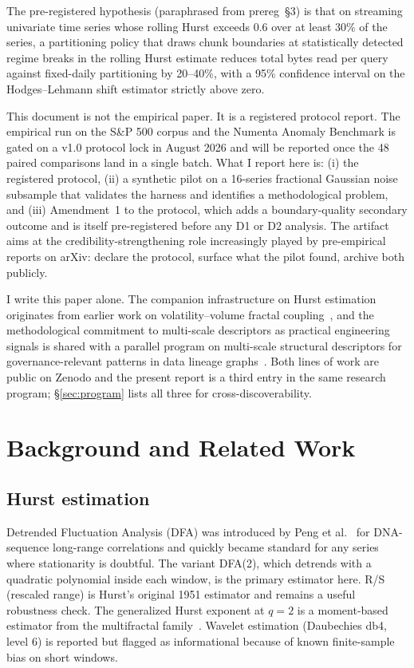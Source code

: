 \documentclass[11pt]{article}
\begin{document}
The pre-registered hypothesis (paraphrased from prereg~\S3) is that on streaming univariate time series whose rolling Hurst exceeds 0.6 over at least 30\% of the series, a partitioning policy that draws chunk boundaries at statistically detected regime breaks in the rolling Hurst estimate reduces total bytes read per query against fixed-daily partitioning by 20--40\%, with a 95\% confidence interval on the Hodges--Lehmann shift estimator strictly above zero.

This document is not the empirical paper. It is a registered protocol report. The empirical run on the S\&P 500 corpus and the Numenta Anomaly Benchmark is gated on a v1.0 protocol lock in August 2026 and will be reported once the 48 paired comparisons land in a single batch. What I report here is: (i) the registered protocol, (ii) a synthetic pilot on a 16-series fractional Gaussian noise subsample that validates the harness and identifies a methodological problem, and (iii) Amendment~1 to the protocol, which adds a boundary-quality secondary outcome and is itself pre-registered before any D1 or D2 analysis. The artifact aims at the credibility-strengthening role increasingly played by pre-empirical reports on arXiv: declare the protocol, surface what the pilot found, archive both publicly.

I write this paper alone. The companion infrastructure on Hurst estimation originates from earlier work on volatility--volume fractal coupling~\cite{malempatihari2026fractal}, and the methodological commitment to multi-scale descriptors as practical engineering signals is shared with a parallel program on multi-scale structural descriptors for governance-relevant patterns in data lineage graphs~\cite{malempatihari2026governance}. Both lines of work are public on Zenodo and the present report is a third entry in the same research program; \S\ref{sec:program} lists all three for cross-discoverability.

\section{Background and Related Work}

\subsection{Hurst estimation}

Detrended Fluctuation Analysis (DFA) was introduced by Peng et al.~\cite{peng1994dfa} for DNA-sequence long-range correlations and quickly became standard for any series where stationarity is doubtful. The variant DFA(2), which detrends with a quadratic polynomial inside each window, is the primary estimator here. R/S (rescaled range) is Hurst's original 1951 estimator and remains a useful robustness check. The generalized Hurst exponent at $q=2$ is a moment-based estimator from the multifractal family~\cite{kantelhardt2002mfdfa}. Wavelet estimation (Daubechies db4, level 6) is reported but flagged as informational because of known finite-sample bias on short windows.
\end{document}
